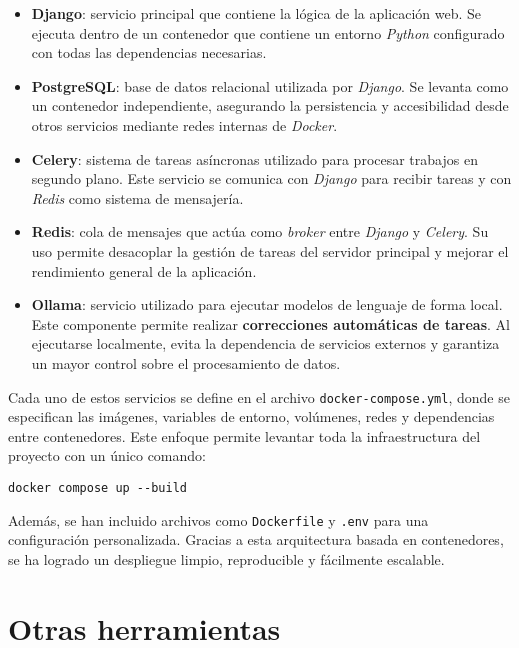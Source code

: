 \begin{itemize}
  \item \textbf{Django}: servicio principal que contiene la lógica de la aplicación web. Se ejecuta dentro de un contenedor que contiene un entorno \textit{Python} configurado con todas las dependencias necesarias.
  
  \item \textbf{PostgreSQL}: base de datos relacional utilizada por \textit{Django}. Se levanta como un contenedor independiente, asegurando la persistencia y accesibilidad desde otros servicios mediante redes internas de \textit{Docker}.
  
  \item \textbf{Celery}: sistema de tareas asíncronas utilizado para procesar trabajos en segundo plano. Este servicio se comunica con \textit{Django} para recibir tareas y con \textit{Redis} como sistema de mensajería.
  
  \item \textbf{Redis}: cola de mensajes que actúa como \textit{broker} entre \textit{Django} y \textit{Celery}. Su uso permite desacoplar la gestión de tareas del servidor principal y mejorar el rendimiento general de la aplicación.
  
  \item \textbf{Ollama}: servicio utilizado para ejecutar modelos de lenguaje de forma local. Este componente permite realizar \textbf{correcciones automáticas de tareas}. Al ejecutarse localmente, evita la dependencia de servicios externos y garantiza un mayor control sobre el procesamiento de datos.
\end{itemize}

Cada uno de estos servicios se define en el archivo \texttt{docker-compose.yml}, donde se especifican las imágenes, variables de entorno, volúmenes, redes y dependencias entre contenedores. Este enfoque permite levantar toda la infraestructura del proyecto con un único comando:

\begin{verbatim}
docker compose up --build
\end{verbatim}

Además, se han incluido archivos como \texttt{Dockerfile} y \texttt{.env} para una configuración personalizada. Gracias a esta arquitectura basada en contenedores, se ha logrado un despliegue limpio, reproducible y fácilmente escalable.

\section{Otras herramientas}

